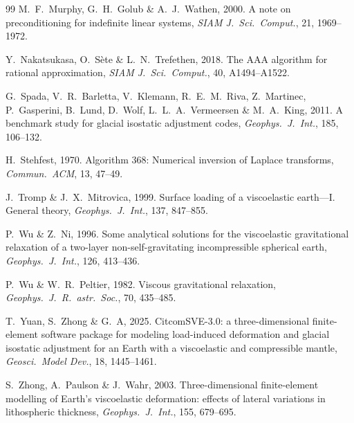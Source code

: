 \documentclass[11pt]{article}
\numberwithin{equation}{section}
\begin{document}
\begin{thebibliography}{99}
M.~F.~Murphy, G.~H.~Golub \& A.~J.~Wathen, 2000.
A note on preconditioning for indefinite linear systems,
\emph{SIAM J.\ Sci.\ Comput.}, 21, 1969--1972.

Y.~Nakatsukasa, O.~S\`ete \& L.~N.~Trefethen, 2018.
The AAA algorithm for rational approximation,
\emph{SIAM J.\ Sci.\ Comput.}, 40, A1494--A1522.

G.~Spada, V.~R.~Barletta, V.~Klemann, R.~E.~M.~Riva, Z.~Martinec,
P.~Gasperini, B.~Lund, D.~Wolf, L.~L.~A.~Vermeersen \& M.~A.~King, 2011.
A benchmark study for glacial isostatic adjustment codes,
\emph{Geophys.\ J.\ Int.}, 185, 106--132.

H.~Stehfest, 1970.
Algorithm 368: Numerical inversion of Laplace transforms,
\emph{Commun.\ ACM}, 13, 47--49.

J.~Tromp \& J.~X.~Mitrovica, 1999.
Surface loading of a viscoelastic earth---I. General theory,
\emph{Geophys.\ J.\ Int.}, 137, 847--855.

P.~Wu \& Z.~Ni, 1996.
Some analytical solutions for the viscoelastic gravitational relaxation of
a two-layer non-self-gravitating incompressible spherical earth,
\emph{Geophys.\ J.\ Int.}, 126, 413--436.

P.~Wu \& W.~R.~Peltier, 1982.
Viscous gravitational relaxation, \emph{Geophys.\ J.\ R.\ astr.\ Soc.}, 70,
435--485.

T.~Yuan, S.~Zhong \& G.~A, 2025.
CitcomSVE-3.0: a three-dimensional finite-element software package for
modeling load-induced deformation and glacial isostatic adjustment for an
Earth with a viscoelastic and compressible mantle,
\emph{Geosci.\ Model Dev.}, 18, 1445--1461.

S.~Zhong, A.~Paulson \& J.~Wahr, 2003.
Three-dimensional finite-element modelling of Earth's viscoelastic
deformation: effects of lateral variations in lithospheric thickness,
\emph{Geophys.\ J.\ Int.}, 155, 679--695.

\end{thebibliography}
\end{document}
